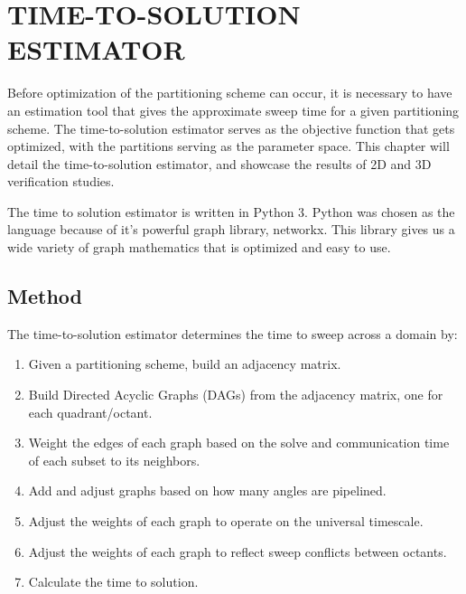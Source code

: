 %
%
%
%
 \setcounter{MaxMatrixCols}{30}
\newcommand{\tcr}[1]{\textcolor{red}{#1}}


\chapter{TIME-TO-SOLUTION ESTIMATOR \label{cha:tts}}

Before optimization of the partitioning scheme can occur, it is necessary to have an estimation tool that gives the approximate sweep time for a given partitioning scheme. The time-to-solution estimator serves as the objective function that gets optimized, with the partitions serving as the parameter space. This chapter will detail the time-to-solution estimator, and showcase the results of 2D and 3D verification studies. 

The time to solution estimator is written in Python 3. Python was chosen as the language because of it's powerful graph library, networkx. 
This library gives us a wide variety of graph mathematics that is optimized and easy to use. 

\section{Method}
The time-to-solution estimator determines the time to sweep across a domain by:
\begin{enumerate}
	\item Given a partitioning scheme, build an adjacency matrix.
	\item Build Directed Acyclic Graphs  (DAGs) from the adjacency matrix, one for each quadrant/octant.
	\item Weight the edges of each graph based on the solve and communication time of each subset to its neighbors.
     \item Add and adjust graphs based on how many angles are pipelined.
	\item Adjust the weights of each graph to operate on the universal timescale.
	\item Adjust the weights of each graph to reflect sweep conflicts between octants. 
	\item Calculate the time to solution.
\end{enumerate}

